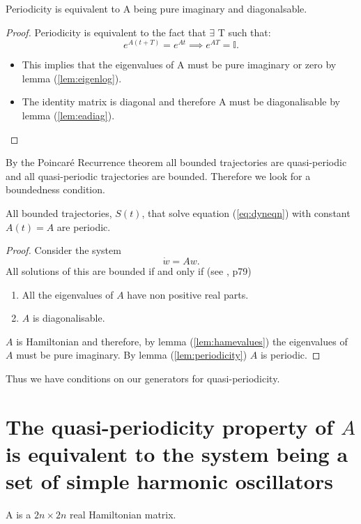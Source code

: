 \begin{lemma} Periodicity is equivalent to A being pure imaginary and diagonalsable. \label{lem:periodicity} \end{lemma}
\begin{proof}
Periodicity is equivalent to the fact that $\exists$ T such that:
\begin{equation}
e^{A(t+T)}=e^{At} \implies e^{AT}=\mathbb{I}.
\end{equation}
\begin{itemize}
\item This implies that the eigenvalues of A must be pure imaginary or zero by lemma (\ref{lem:eigenlog}). 
\item The identity matrix is diagonal and therefore A must be diagonalisable by lemma (\ref{lem:eadiag}).
\end{itemize}
\end{proof}

By the Poincar\'{e} Recurrence theorem all bounded trajectories are quasi-periodic and all quasi-periodic trajectories are bounded. Therefore we look for a boundedness condition. 

\begin{proposition}
All bounded trajectories, $S(t)$, that solve equation (\ref{eq:dyneqn}) with constant $A(t)=A$ are periodic.
\end{proposition}
\begin{proof}
Consider the system
\begin{equation}
\dot{w} = Aw.
\end{equation}
All solutions of this are bounded if and only if (see \cite{Meyer}, p79)
\begin{enumerate}
\item All the eigenvalues of $A$ have non positive real parts.
\item $A$ is diagonalisable.
\end{enumerate}

$A$ is Hamiltonian and therefore, by lemma (\ref{lem:hamevalues}) the eigenvalues of $A$ must be pure imaginary. By lemma (\ref{lem:periodicity}) $A$ is periodic.
\end{proof}

Thus we have conditions on our generators for quasi-periodicity.

\section{The quasi-periodicity property of $A$ is equivalent to the system being a set of simple harmonic oscillators}
A is a $2n \times 2n$ real Hamiltonian matrix. 

